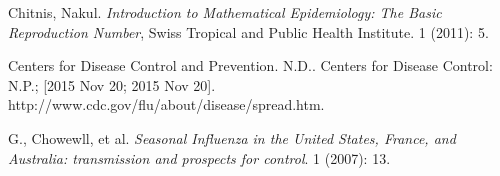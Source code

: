 \documentclass[11pt, oneside]{article}   	%
\begin{document}
\bigskip

\noindent[3] Chitnis, Nakul. \textit{Introduction to Mathematical Epidemiology: The Basic Reproduction Number}, Swiss Tropical and Public Health Institute. 1 (2011): 5.

\bigskip

\noindent[4] Centers for Disease Control and Prevention. N.D.. Centers for Disease Control: N.P.; [2015 Nov 20; 2015 Nov 20]. http://www.cdc.gov/flu/about/disease/spread.htm.

\bigskip

\noindent[5] G., Chowewll, et al. \textit{Seasonal Influenza in the United States, France, and Australia: transmission and prospects for control}. 1 (2007): 13.
\end{document}
